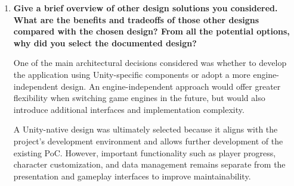 \documentclass[10pt, titlepage]{article}
\begin{document}
\begin{enumerate}
    Another limitation is the lack of direct usability testing
    with children, as the project does not currently have the
    ethics approval required for such research. This makes it
    difficult to determine how effectively children will
    understand and interact with the game.

    With unlimited resources, supervised usability studies
    could be conducted with children and caregivers, alongside
    more extensive collaboration with healthcare professionals.
    Additional preparation activities could also be developed
    to cover a wider range of ophthalmology examinations.

    Furthermore, working more closely with ophthalmologists
    would help improve how accurately the game represents
    real-life eye examinations, including the equipment,
    procedures, instructions, and sensations children may
    experience. This would make the preparation activities
    more realistic while maintaining an age-appropriate
    and engaging experience.

    Additional development time could also be dedicated to
    improving the 3D environments, character animations,
    accessibility features, and overall gameplay experience.
    Testing on a wider range of mobile devices would further
    improve the application's reliability and usability.



    \item \textbf{Give a brief overview of other design solutions you
    considered. What are the benefits and tradeoffs of those other designs
    compared with the chosen design? From all the potential options, why did
    you select the documented design?}
    
    One of the main architectural decisions considered was
    whether to develop the application using Unity-specific
    components or adopt a more engine-independent design.
    An engine-independent approach would offer greater
    flexibility when switching game engines in the future,
    but would also introduce additional interfaces and
    implementation complexity.

    A Unity-native design was ultimately selected because
    it aligns with the project's development environment
    and allows further development of the existing PoC.
    However, important functionality such as player progress,
    character customization, and data management remains
    separate from the presentation and gameplay interfaces
    to improve maintainability.


\end{enumerate}
\end{document}
